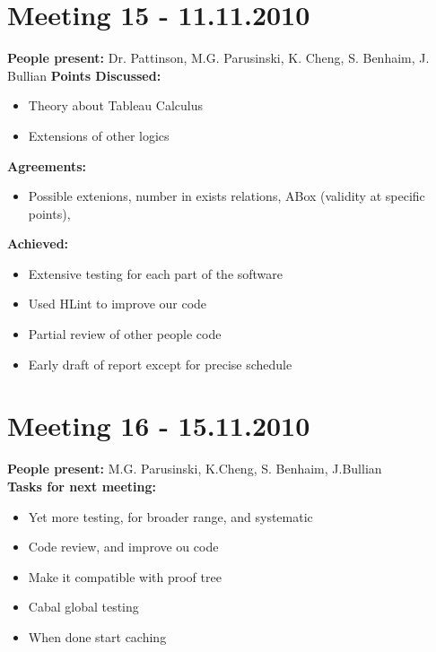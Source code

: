 \documentclass[12pt]{article}
\begin{document}
\section*{Meeting 15 - 11.11.2010}
\textbf{People present:} Dr. Pattinson, M.G. Parusinski, K. Cheng, S. Benhaim, J. Bullian
\textbf{Points Discussed:}
\begin{itemize}
\item Theory about Tableau Calculus
\item Extensions of other logics
\end{itemize}
\textbf{Agreements:}
\begin{itemize}
\item Possible extenions, number in exists relations, ABox (validity at specific points), 
\end{itemize}
\textbf{Achieved:}
\begin{itemize}
\item Extensive testing for each part of the software
\item Used HLint to improve our code
\item Partial review of other people code
\item Early draft of report except for precise schedule
\end{itemize}

\section*{Meeting 16 - 15.11.2010}
\textbf{People present:} M.G. Parusinski, K.Cheng, S. Benhaim,  J.Bullian\\ 
\textbf{Tasks for next meeting:}
\begin{itemize}
\item Yet more testing, for broader range, and systematic
\item Code review, and improve ou code
\item Make it compatible with proof tree
\item Cabal global testing
\item When done start caching
\end{itemize}
\end{document}
